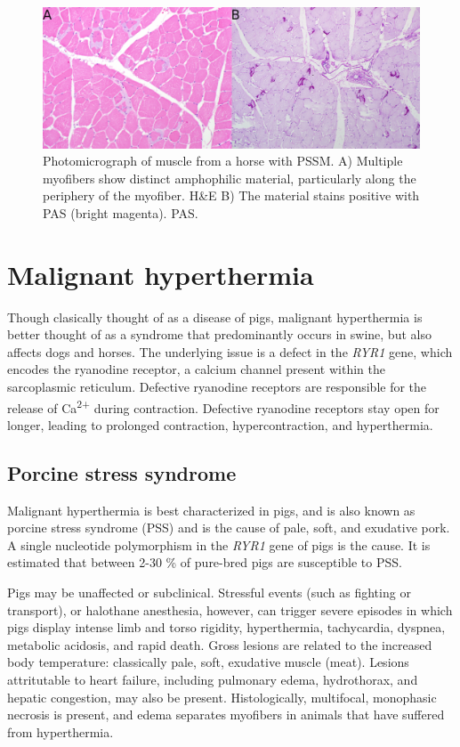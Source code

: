 \documentclass[openany]{book}
\begin{document}
\begin{figure}
\centering
\includegraphics{images/PSSM.jpg}
\caption{\label{fig:PSSM}Photomicrograph of muscle from a horse with PSSM.
A) Multiple myofibers show distinct amphophilic material, particularly
along the periphery of the myofiber. H\&E B) The material stains
positive with PAS (bright magenta). PAS.}
\end{figure}

\section{Malignant hyperthermia}\label{malignant-hyperthermia}

Though clasically thought of as a disease of pigs, malignant
hyperthermia is better thought of as a syndrome that predominantly
occurs in swine, but also affects dogs and horses. The underlying issue
is a defect in the \emph{RYR1} gene, which encodes the ryanodine
receptor, a calcium channel present within the sarcoplasmic reticulum.
Defective ryanodine receptors are responsible for the release of
Ca\textsuperscript{2+} during contraction. Defective ryanodine receptors
stay open for longer, leading to prolonged contraction,
hypercontraction, and hyperthermia.

\subsection{Porcine stress syndrome}\label{porcine-stress-syndrome}

Malignant hyperthermia is best characterized in pigs, and is also known
as porcine stress syndrome (PSS) and is the cause of pale, soft, and
exudative pork. A single nucleotide polymorphism in the \emph{RYR1} gene
of pigs is the cause. It is estimated that between 2-30 \% of pure-bred
pigs are susceptible to PSS.

Pigs may be unaffected or subclinical. Stressful events (such as
fighting or transport), or halothane anesthesia, however, can trigger
severe episodes in which pigs display intense limb and torso rigidity,
hyperthermia, tachycardia, dyspnea, metabolic acidosis, and rapid death.
Gross lesions are related to the increased body temperature: classically
pale, soft, exudative muscle (meat). Lesions attritutable to heart
failure, including pulmonary edema, hydrothorax, and hepatic congestion,
may also be present. Histologically, multifocal, monophasic necrosis is
present, and edema separates myofibers in animals that have suffered
from hyperthermia.
\end{document}
